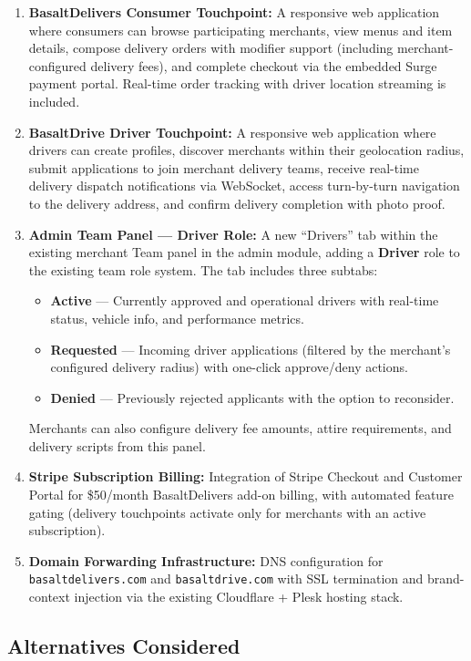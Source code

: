 \documentclass[11pt, letterpaper]{article}
\begin{document}
\begin{enumerate}
    \item \textbf{BasaltDelivers Consumer Touchpoint:} A responsive web application where consumers can browse participating merchants, view menus and item details, compose delivery orders with modifier support (including merchant-configured delivery fees), and complete checkout via the embedded Surge payment portal. Real-time order tracking with driver location streaming is included.
    \item \textbf{BasaltDrive Driver Touchpoint:} A responsive web application where drivers can create profiles, discover merchants within their geolocation radius, submit applications to join merchant delivery teams, receive real-time delivery dispatch notifications via WebSocket, access turn-by-turn navigation to the delivery address, and confirm delivery completion with photo proof.
    \item \textbf{Admin Team Panel --- Driver Role:} A new ``Drivers'' tab within the existing merchant Team panel in the admin module, adding a \textbf{Driver} role to the existing team role system. The tab includes three subtabs:
    \begin{itemize}
        \item \textbf{Active} --- Currently approved and operational drivers with real-time status, vehicle info, and performance metrics.
        \item \textbf{Requested} --- Incoming driver applications (filtered by the merchant's configured delivery radius) with one-click approve/deny actions.
        \item \textbf{Denied} --- Previously rejected applicants with the option to reconsider.
    \end{itemize}
    Merchants can also configure delivery fee amounts, attire requirements, and delivery scripts from this panel.
    \item \textbf{Stripe Subscription Billing:} Integration of Stripe Checkout and Customer Portal for \$50/month BasaltDelivers add-on billing, with automated feature gating (delivery touchpoints activate only for merchants with an active subscription).
    \item \textbf{Domain Forwarding Infrastructure:} DNS configuration for \texttt{basaltdelivers.com} and \texttt{basaltdrive.com} with SSL termination and brand-context injection via the existing Cloudflare + Plesk hosting stack.
\end{enumerate}

\subsection{Alternatives Considered}
\end{document}
